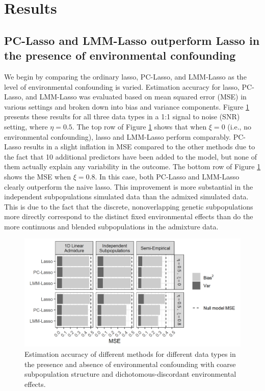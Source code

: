 \section{Results} \label{sec:results}

\subsection{PC-Lasso and LMM-Lasso outperform Lasso in the presence of environmental confounding}

We begin by comparing the ordinary lasso, PC-Lasso, and LMM-Lasso as the level of environmental confounding is varied. Estimation accuracy for lasso, PC-Lasso, and LMM-Lasso was evaluated based on mean squared error (MSE) in various settings and broken down into bias and variance components.  Figure \ref{fig:mse} presents these results for all three data types in a 1:1 signal to noise (SNR) setting, where $\eta = 0.5$. The top row of Figure \ref{fig:mse} shows that when $\xi = 0$ (i.e., no environmental confounding), lasso and LMM-Lasso perform comparably. PC-Lasso results in a slight inflation in MSE compared to the other methods due to the fact that 10 additional predictors have been added to the model, but none of them actually explain any variability in the outcome. The bottom row of Figure \ref{fig:mse} shows the MSE when $\xi = 0.8$. In this case, both PC-Lasso and LMM-Lasso clearly outperform the naive lasso. This improvement is more substantial in the independent subpopulations simulated data than the admixed simulated data. This is due to the fact that the discrete, nonoverlapping genetic subpopulations more directly correspond to the distinct fixed environmental effects than do the more continuous and blended subpopulations in the admixture data.


\begin{figure}[H]
    \centering
    \includegraphics[scale = 1.1]{figures/beta_mse.png}
    \caption{Estimation accuracy of different methods for different data types in the presence and absence of environmental confounding with coarse subpopulation structure and dichotomous-discordant environmental effects.}
    \label{fig:mse}
\end{figure}

